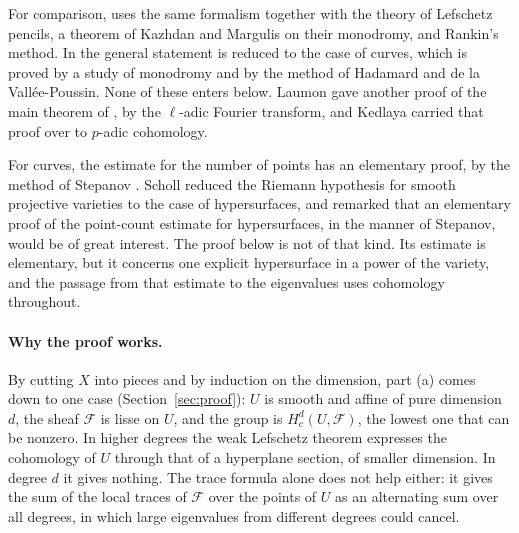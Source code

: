 \documentclass[11pt,a4paper]{article}
\theoremstyle{plain}
\theoremstyle{remark}
\newcommand{\F}{\mathcal F}
\begin{document}
For comparison, \cite{WeilI} uses the same formalism together with the theory of Lefschetz pencils, a theorem of
Kazhdan and Margulis on their monodromy, and Rankin's method. In \cite{WeilII} the general statement is reduced to
the case of curves, which is proved by a study of monodromy and by the method of Hadamard and de la
Vall\'ee-Poussin. None of these enters below. Laumon \cite{Laumon} gave another proof of the main theorem of
\cite{WeilII}, by the $\ell$-adic Fourier transform, and Kedlaya \cite{Kedlaya} carried that proof over to $p$-adic
cohomology.

For curves, the estimate for the number of points has an elementary proof, by the method of Stepanov
\cite{Bombieri}. Scholl \cite{Scholl} reduced the Riemann hypothesis for smooth projective varieties to the case of
hypersurfaces, and remarked that an elementary proof of the point-count estimate for hypersurfaces, in the manner of
Stepanov, would be of great interest. The proof below is not of that kind. Its estimate is elementary, but it
concerns one explicit hypersurface in a power of the variety, and the passage from that estimate to the eigenvalues
uses cohomology throughout.

\paragraph{Why the proof works.}
By cutting $X$ into pieces and by induction on the dimension, part (a) comes down to one case
(Section~\ref{sec:proof}): $U$ is smooth and affine of pure dimension $d$, the sheaf $\F$ is lisse on $U$, and the
group is $H^d_c(U,\F)$, the lowest one that can be nonzero. In higher degrees the weak Lefschetz theorem expresses
the cohomology of $U$ through that of a hyperplane section, of smaller dimension. In degree $d$ it gives nothing. The
trace formula alone does not help either: it gives the sum of the local traces of $\F$ over the points of $U$ as an
alternating sum over all degrees, in which large eigenvalues from different degrees could cancel.
\end{document}

